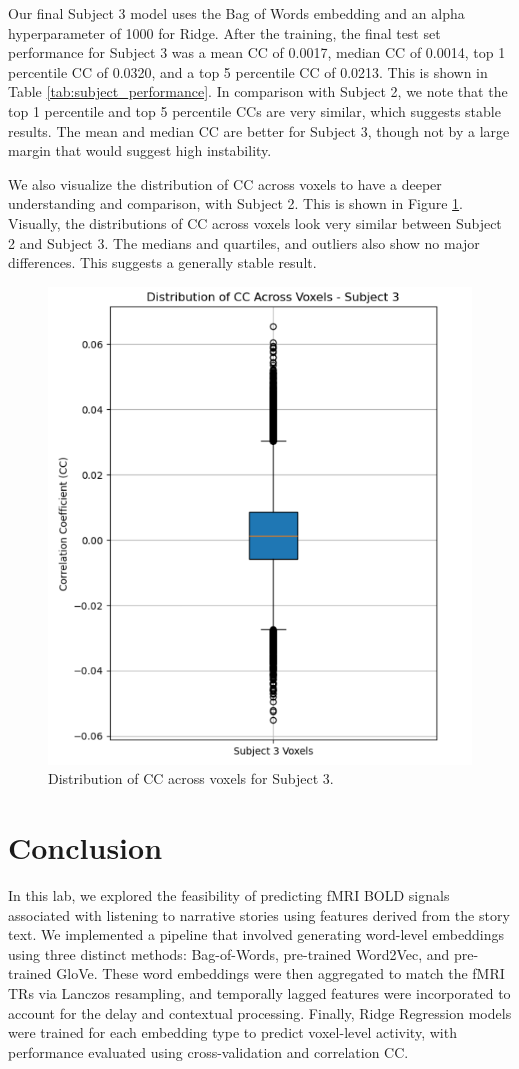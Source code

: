 \documentclass[10pt,letterpaper]{article}
\begin{document}
Our final Subject 3 model uses the Bag of Words embedding and an alpha hyperparameter of 1000 for Ridge. After the training, the final test set performance for Subject 3 was a mean CC of 0.0017, median CC of 0.0014, top 1 percentile CC of 0.0320, and a top 5 percentile CC of 0.0213. This is shown in Table \ref{tab:subject_performance}. In comparison with Subject 2, we note that the top 1 percentile and top 5 percentile CCs are very similar, which suggests stable results. The mean and median CC are better for Subject 3, though not by a large margin that would suggest high instability.

We also visualize the distribution of CC across voxels to have a deeper understanding and comparison, with Subject 2. This is shown in Figure \ref{fig:cc_dist_voxels_subject_3}. Visually, the distributions of CC across voxels look very similar between Subject 2 and Subject 3. The medians and quartiles, and outliers also show no major differences. This suggests a generally stable result.

\begin{figure}
    \centering
    \includegraphics[width=0.5\linewidth]{figs/cc_dist_voxels_subject_3.png}
    \caption{Distribution of CC across voxels for Subject 3.}
    \label{fig:cc_dist_voxels_subject_3}
\end{figure}



\section{Conclusion}
In this lab, we explored the feasibility of predicting fMRI BOLD signals associated with listening to narrative stories using features derived from the story text. We implemented a pipeline that involved generating word-level embeddings using three distinct methods: Bag-of-Words, pre-trained Word2Vec, and pre-trained GloVe. These word embeddings were then aggregated to match the fMRI TRs via Lanczos resampling, and temporally lagged features were incorporated to account for the delay and contextual processing. Finally, Ridge Regression models were trained for each embedding type to predict voxel-level activity, with performance evaluated using cross-validation and correlation CC.
\end{document}
